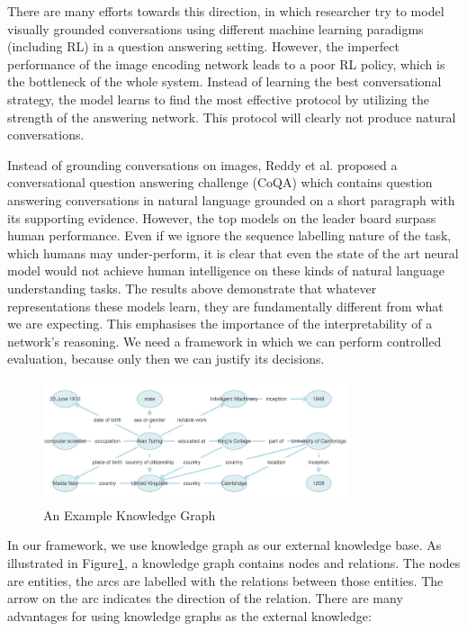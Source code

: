 \documentclass[bsc,frontabs,twoside,singlespacing,parskip,deptreport]{infthesis}     %
\begin{document}
There are many efforts towards this direction, in which researcher\cite{strub2017end,shekhar2017foil,reddy2019coqa,zhou2018dataset,de2017guesswhat,das2017visual,das2017learning} try to model visually grounded conversations using different machine learning paradigms (including RL) in a question answering setting. However, the imperfect performance of the image encoding network leads to a poor RL policy, which is the bottleneck of the whole system. Instead of learning the best conversational strategy, the model learns to find the most effective protocol by utilizing the strength of the answering network. This protocol will clearly not produce natural conversations. 

Instead of grounding conversations on images, Reddy et al.\cite{reddy2019coqa} proposed a conversational question answering challenge (CoQA) which contains question answering conversations in natural language grounded on a short paragraph with its supporting evidence. However, the top models on the leader board surpass human performance. Even if we ignore the sequence labelling nature of the task, which humans may under-perform, it is clear that even the state of the art neural model would not achieve human intelligence on these kinds of natural language understanding tasks. The results above demonstrate that whatever representations these models learn, they are fundamentally different from what we are expecting. This emphasises the importance of the interpretability of a network's reasoning. We need a framework in which we can perform controlled evaluation, because only then we can justify its decisions.

\begin{figure}[h]
    \centering
    \includegraphics[width=0.80\textwidth]{kg.png}
    \caption{An Example Knowledge Graph}
    \label{fig:kg}
\end{figure}

In our framework, we use knowledge graph as our external knowledge base. As illustrated in Figure\ref{fig:kg}, a knowledge graph contains nodes and relations. The nodes are entities, the arcs are labelled with the relations between those entities. The arrow on the arc indicates the direction of the relation. There are many advantages for using knowledge graphs as the external knowledge:
\end{document}
